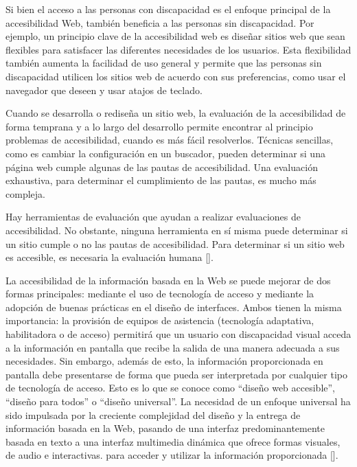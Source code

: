 Si bien el acceso a las personas con discapacidad es el enfoque principal de la accesibilidad Web, también beneficia a las personas sin discapacidad. Por ejemplo, un principio clave de la accesibilidad web es diseñar sitios web que sean flexibles para satisfacer las diferentes necesidades de los usuarios. Esta flexibilidad también aumenta la facilidad de uso general y permite que las personas sin discapacidad utilicen los sitios web de acuerdo con sus preferencias, como usar el navegador que deseen y usar atajos de teclado.

Cuando se desarrolla o rediseña un sitio web, la evaluación de la accesibilidad de forma temprana y a lo largo del desarrollo permite encontrar al principio problemas de accesibilidad, cuando es más fácil resolverlos. Técnicas sencillas, como es cambiar la configuración en un buscador, pueden determinar si una página web cumple algunas de las pautas de accesibilidad. Una evaluación exhaustiva, para determinar el cumplimiento de las pautas, es mucho más compleja. 

Hay herramientas de evaluación que ayudan a realizar evaluaciones de accesibilidad. No obstante, ninguna herramienta en sí misma puede determinar si un sitio cumple o no las pautas de accesibilidad. Para determinar si un sitio web es accesible, es necesaria la evaluación humana [\cite{43}].

La accesibilidad de la información basada en la Web se puede mejorar de dos formas principales: mediante el uso de tecnología de acceso y mediante la adopción de buenas prácticas en el diseño de interfaces. Ambos tienen la misma importancia: la provisión de equipos de asistencia (tecnología adaptativa, habilitadora o de acceso) permitirá que un usuario con discapacidad visual acceda a la información en pantalla que recibe la salida de una manera adecuada a sus necesidades. Sin embargo, además de esto, la información proporcionada en pantalla debe presentarse de forma que pueda ser interpretada por cualquier tipo de tecnología de acceso. Esto es lo que se conoce como “diseño web accesible”, “diseño para todos” o “diseño universal”. La necesidad de un enfoque universal ha sido impulsada por la creciente complejidad del diseño y la entrega de información basada en la Web, pasando de una interfaz predominantemente basada en texto a una interfaz multimedia dinámica que ofrece formas visuales, de audio e interactivas. para acceder y utilizar la información proporcionada [\cite{43}].


